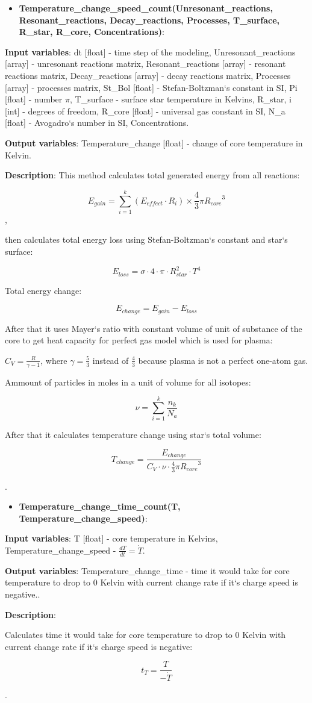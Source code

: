 \documentclass[a4paper,12pt]{article}
\newcommand{\namefunction}[4]{
  \begin{itemize}
    \item \textbf{#1}:
  \end{itemize}
  
  \textbf{Input variables}: #2.
  
  \textbf{Output variables}: #4.
  
  \textbf{Description}: #3.
}
\begin{document}
\namefunction{Temperature\_change\_speed\_count(Unresonant\_reactions, Resonant\_reactions, Decay\_reactions, Processes, T\_surface, R\_star, R\_core, Concentrations)}{dt [float] - time step of the modeling, Unresonant\_reactions [array] - unresonant reactions matrix, Resonant\_reactions [array] - resonant reactions matrix, Decay\_reactions [array] - decay reactions matrix, Processes [array] - processes matrix, St\_Bol [float] - Stefan-Boltzman`s constant in SI, Pi [float] - number $\pi$, T\_surface - surface star temperature in Kelvins, R\_star, i [int] - degrees of freedom, R\_core [float] - universal gas constant in SI, N\_a [float] - Avogadro`s number in SI, Concentrations}{This method calculates total generated energy from all reactions:

\[{E_{gain}} = \sum_{i = 1}^{k} ({E_{effect}} \cdot {R_i}) \times \frac{4}{3} \pi{R_{core}}^{3}\],

 then calculates total energy loss using Stefan-Boltzman`s constant and star`s surface:

\[E_{loss} = \sigma \cdot 4 \cdot \pi \cdot R_{star}^2 \cdot T^4\]

Total energy change:

\[E_{change} = E_{gain} - E_{loss}\]

After that it uses Mayer`s ratio with constant volume of unit of substance of the core to get heat capacity for perfect gas model which is used for plasma:

$C_{V} = \frac{R}{\gamma - 1}$, where $\gamma = \frac{5}{3}$ instead of $\frac{4}{3}$ because plasma is not a perfect one-atom gas.

Ammount of particles in moles in a unit of volume for all isotopes:

\[\nu = \sum_{i = 1}^{k} \frac{n_k}{N_a}\]

After that it calculates temperature change using star`s total volume:

\[T_{change} = \frac{E_{change}}{C_{V} \cdot \nu \cdot \frac{4}{3} \pi{R_{core}}^{3}}\]

}{Temperature\_change [float] - change of core temperature in Kelvin}

\namefunction{Temperature\_change\_time\_count(T, Temperature\_change\_speed)}{T [float] - core temperature in Kelvins, Temperature\_change\_speed - $\frac{dT}{dt} = \dot{T}$}{

Calculates time it would take for core temperature to drop to 0 Kelvin with current change rate if it`s charge speed is negative:

\[t_{T} = \frac{T}{-\dot{T}}\]

}{Temperature\_change\_time - time it would take for core temperature to drop to 0 Kelvin with current change rate if it`s charge speed is negative.}
\end{document}
